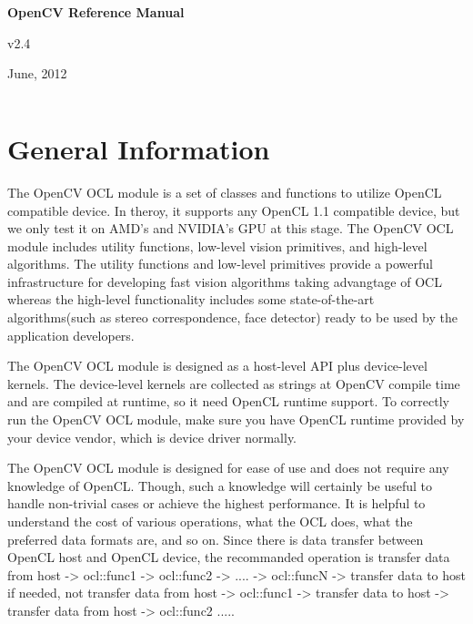 \documentclass{article}
\begin{document}
\begin{center}
\textbf{OpenCV Reference Manual}
\end{center}

\begin{center}
v2.4
\end{center}

\begin{center}
June, 2012
\end{center}

\newpage

\begin{table}[htbp]
\begin{center}
\begin{tabular}{|p{426pt}|}
\hline
 \\
\hline
\end{tabular}
\label{tab1}
\end{center}
\end{table}


\section { General Information }
The OpenCV OCL module is a set of classes and functions to utilize OpenCL compatible device. In theroy, it supports any OpenCL 1.1 compatible device, but we only test it on AMD's and NVIDIA's GPU at this stage. The OpenCV OCL module includes utility functions, low-level vision primitives, and high-level algorithms. The utility functions and low-level primitives provide a powerful infrastructure for developing fast vision algorithms taking advangtage of OCL whereas the high-level functionality includes some state-of-the-art algorithms(such as stereo correspondence, face detector) ready to be used by the application developers.

The OpenCV OCL module is designed as a host-level API plus device-level kernels. The device-level kernels are collected as strings at OpenCV compile time and are compiled at runtime, so it need OpenCL runtime support. To correctly run the OpenCV OCL module, make sure you have OpenCL runtime provided by your device vendor, which is device driver normally.

The OpenCV OCL module is designed for ease of use and does not require any knowledge of OpenCL. Though, such a knowledge will certainly be useful to handle non-trivial cases or achieve the highest performance. It is helpful to understand the cost of various operations, what the OCL does, what the preferred data formats are, and so on. Since there is data transfer between OpenCL host and OpenCL device, the recommanded operation is transfer data from host -> ocl::func1 -> ocl::func2 -> .... -> ocl::funcN -> transfer data to host if needed, not transfer data from host -> ocl::func1 -> transfer data to host -> transfer data from host -> ocl::func2 .....
\end{document}
